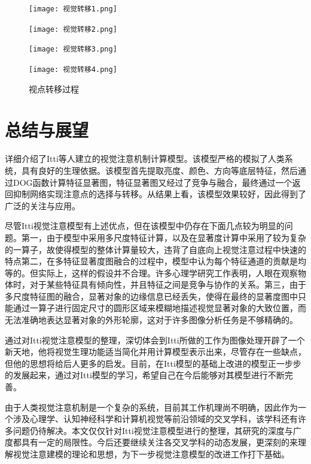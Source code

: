 \documentclass[a4paper,10pt]{article}\large
\begin{document}
\begin{figure}[!ht]
\begin{minipage}[c]{0.22\textwidth}
\centering
\texttt{[image: 视觉转移1.png]}
\end{minipage}
\hspace{2ex}
\begin{minipage}[c]{0.22\textwidth}
\centering
\texttt{[image: 视觉转移2.png]}
\end{minipage}
\hspace{2ex}
\begin{minipage}[c]{0.22\textwidth}
\centering
\texttt{[image: 视觉转移3.png]}
\end{minipage}
\hspace{2ex}
\begin{minipage}[c]{0.22\textwidth}
\centering
\texttt{[image: 视觉转移4.png]}
\end{minipage}
\caption{视点转移过程}\label{fig:13}
\end{figure} 

\section{总结与展望}

详细介绍了Itti等人建立的视觉注意机制计算模型。该模型严格的模拟了人类系统，具有良好的生理依据。该模型首先提取亮度、颜色、方向等底层特征，然后通过DOG函数计算特征显著图，特征显著图又经过了竞争与融合，最终通过一个返回抑制网络实现注意点的选择与转移。从结果上看，该模型效果较好，因此得到了广泛的关注与应用。


尽管Itti视觉注意模型有上述优点，但在该模型中仍存在下面几点较为明显的问题。第一，由于模型中采用多尺度特征计算，以及在显著度计算中采用了较为复杂的一算子，故使得模型的整体计算量较大，违背了自底向上视觉注意过程中快速的特点第二，在多特征显著度图融合的过程中，模型中认为每个特征通道的贡献是均等的。但实际上，这样的假设并不合理。许多心理学研究工作表明，人眼在观察物体时，对于某些特征具有倾向性，并且特征之间是竞争与协作的关系。第三，由于多尺度特征图的融合，显著对象的边缘信息已经丢失，使得在最终的显著度图中只能通过一算子进行固定尺寸的圆形区域来模糊地描述视觉显著对象的大致位置，而无法准确地表达显著对象的外形轮廓，这对于许多图像分析任务是不够精确的。


通过对Itti视觉注意模型的整理，深切体会到Itti所做的工作为图像处理开辟了一个新天地，他将视觉生理功能适当简化并用计算模型表示出来，尽管存在一些缺点，但他的思想将给后人更多的启发。目前，在Itti模型的基础上改进的模型正一步步的发展起来，通过对Itti模型的学习，希望自己在今后能够对其模型进行不断完善。


由于人类视觉注意机制是一个复杂的系统，目前其工作机理尚不明确，因此作为一个涉及心理学、认知神经科学和计算机视觉等前沿领域的交叉学科，该学科还有许多问题仍待解决。本文仅仅针对Itti视觉注意模型进行的整理，其研究的深度与广度都具有一定的局限性。今后还要继续关注各交叉学科的动态发展，更深刻的来理解视觉注意建模的理论和思想，为下一步视觉注意模型的改进工作打下基础。






\end{document}
